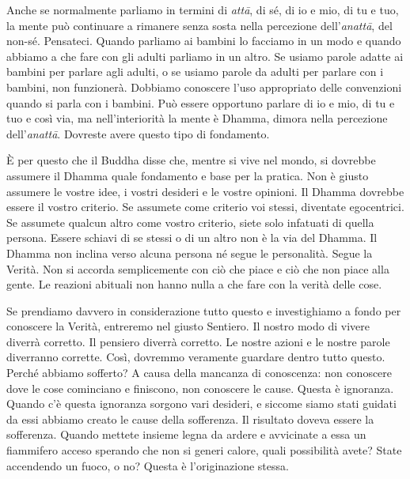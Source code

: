 Anche se normalmente parliamo in termini di \emph{attā}, di sé, di io e
mio, di tu e tuo, la mente può continuare a rimanere senza sosta nella
percezione dell'\emph{anattā}, del non-sé. Pensateci. Quando parliamo ai
bambini lo facciamo in un modo e quando abbiamo a che fare con gli
adulti parliamo in un altro. Se usiamo parole adatte ai bambini per
parlare agli adulti, o se usiamo parole da adulti per parlare con i
bambini, non funzionerà. Dobbiamo conoscere l'uso appropriato delle
convenzioni quando si parla con i bambini. Può essere opportuno parlare
di io e mio, di tu e tuo e così via, ma nell'interiorità la mente è
Dhamma, dimora nella percezione dell'\emph{anattā}. Dovreste avere
questo tipo di fondamento.

È per questo che il Buddha disse che, mentre si vive nel mondo, si
dovrebbe assumere il Dhamma quale fondamento e base per la pratica. Non
è giusto assumere le vostre idee, i vostri desideri e le vostre
opinioni. Il Dhamma dovrebbe essere il vostro criterio. Se assumete come
criterio voi stessi, diventate egocentrici. Se assumete qualcun altro
come vostro criterio, siete solo infatuati di quella persona. Essere
schiavi di se stessi o di un altro non è la via del Dhamma. Il Dhamma
non inclina verso alcuna persona né segue le personalità. Segue la
Verità. Non si accorda semplicemente con ciò che piace e ciò che non
piace alla gente. Le reazioni abituali non hanno nulla a che fare con la
verità delle cose.

Se prendiamo davvero in considerazione tutto questo e investighiamo a
fondo per conoscere la Verità, entreremo nel giusto Sentiero. Il nostro
modo di vivere diverrà corretto. Il pensiero diverrà corretto. Le nostre
azioni e le nostre parole diverranno corrette. Così, dovremmo veramente
guardare dentro tutto questo. Perché abbiamo sofferto? A causa della
mancanza di conoscenza: non conoscere dove le cose cominciano e
finiscono, non conoscere le cause. Questa è ignoranza. Quando c'è questa
ignoranza sorgono vari desideri, e siccome siamo stati guidati da essi
abbiamo creato le cause della sofferenza. Il risultato doveva essere la
sofferenza. Quando mettete insieme legna da ardere e avvicinate a essa
un fiammifero acceso sperando che non si generi calore, quali
possibilità avete? State accendendo un fuoco, o no? Questa è
l'originazione stessa.

